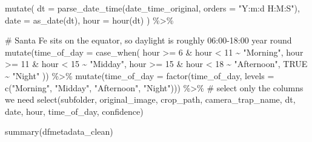 \documentclass[
  letterpaper,
  DIV=11,
  numbers=noendperiod]{scrartcl}
\newenvironment{Shaded}{\begin{snugshade}}{\end{snugshade}}
\newcommand{\AttributeTok}[1]{\textcolor[rgb]{0.40,0.45,0.13}{#1}}
\newcommand{\CommentTok}[1]{\textcolor[rgb]{0.37,0.37,0.37}{#1}}
\newcommand{\ConstantTok}[1]{\textcolor[rgb]{0.56,0.35,0.01}{#1}}
\newcommand{\DecValTok}[1]{\textcolor[rgb]{0.68,0.00,0.00}{#1}}
\newcommand{\FunctionTok}[1]{\textcolor[rgb]{0.28,0.35,0.67}{#1}}
\newcommand{\NormalTok}[1]{\textcolor[rgb]{0.00,0.23,0.31}{#1}}
\newcommand{\SpecialCharTok}[1]{\textcolor[rgb]{0.37,0.37,0.37}{#1}}
\newcommand{\StringTok}[1]{\textcolor[rgb]{0.13,0.47,0.30}{#1}}
\begin{document}
\begin{Shaded}
\begin{Highlighting}[]
  \FunctionTok{mutate}\NormalTok{(}
    \AttributeTok{dt   =} \FunctionTok{parse\_date\_time}\NormalTok{(date\_time\_original, }\AttributeTok{orders =} \StringTok{"Y:m:d H:M:S"}\NormalTok{),}
    \AttributeTok{date =} \FunctionTok{as\_date}\NormalTok{(dt),}
    \AttributeTok{hour =} \FunctionTok{hour}\NormalTok{(dt)}
\NormalTok{  ) }\SpecialCharTok{\%\textgreater{}\%}

  \CommentTok{\# Santa Fe sits on the equator, so daylight is roughly 06:00{-}18:00 year round}
  \FunctionTok{mutate}\NormalTok{(}\AttributeTok{time\_of\_day =} \FunctionTok{case\_when}\NormalTok{(}
\NormalTok{    hour }\SpecialCharTok{\textgreater{}=} \DecValTok{6}  \SpecialCharTok{\&}\NormalTok{ hour }\SpecialCharTok{\textless{}} \DecValTok{11} \SpecialCharTok{\textasciitilde{}} \StringTok{"Morning"}\NormalTok{,}
\NormalTok{    hour }\SpecialCharTok{\textgreater{}=} \DecValTok{11} \SpecialCharTok{\&}\NormalTok{ hour }\SpecialCharTok{\textless{}} \DecValTok{15} \SpecialCharTok{\textasciitilde{}} \StringTok{"Midday"}\NormalTok{,}
\NormalTok{    hour }\SpecialCharTok{\textgreater{}=} \DecValTok{15} \SpecialCharTok{\&}\NormalTok{ hour }\SpecialCharTok{\textless{}} \DecValTok{18} \SpecialCharTok{\textasciitilde{}} \StringTok{"Afternoon"}\NormalTok{,}
    \ConstantTok{TRUE} \SpecialCharTok{\textasciitilde{}} \StringTok{"Night"}
\NormalTok{  )) }\SpecialCharTok{\%\textgreater{}\%}
  \FunctionTok{mutate}\NormalTok{(}\AttributeTok{time\_of\_day =} \FunctionTok{factor}\NormalTok{(time\_of\_day,}
                              \AttributeTok{levels =} \FunctionTok{c}\NormalTok{(}\StringTok{"Morning"}\NormalTok{, }\StringTok{"Midday"}\NormalTok{, }\StringTok{"Afternoon"}\NormalTok{, }\StringTok{"Night"}\NormalTok{))) }\SpecialCharTok{\%\textgreater{}\%}
  \CommentTok{\# select only the columns we need}
  \FunctionTok{select}\NormalTok{(subfolder, original\_image, crop\_path, camera\_trap\_name,}
\NormalTok{         dt, date, hour, time\_of\_day, confidence)}


\FunctionTok{summary}\NormalTok{(dfmetadata\_clean)}
\end{Highlighting}
\end{Shaded}
\end{document}
